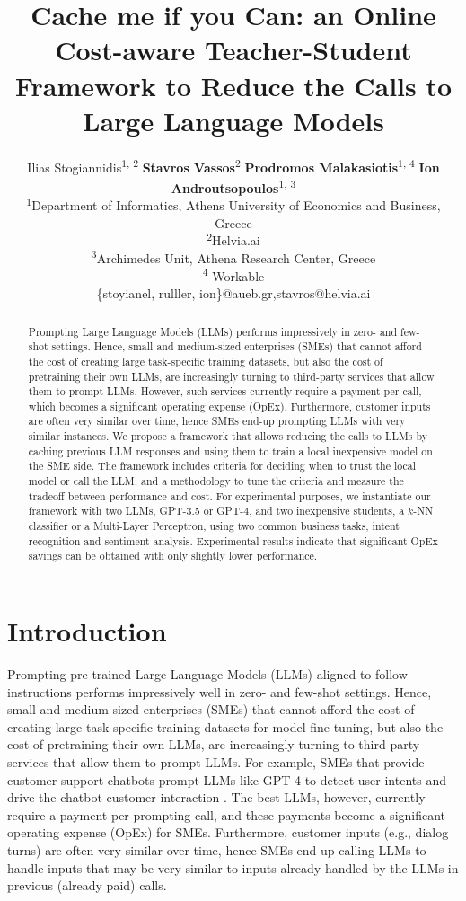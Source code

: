 \documentclass[11pt]{article}
\title{Cache me if you Can: an Online Cost-aware Teacher-Student Framework to Reduce the Calls to Large Language Models}
\author{Ilias Stogiannidis\textsuperscript{$1$, $2$} 
  {\bf Stavros Vassos}\textsuperscript{$2$}
  {\bf Prodromos Malakasiotis}\textsuperscript{$1$, $4$}
  {\bf Ion Androutsopoulos}\textsuperscript{$1$, $3$}\\
  \textsuperscript{$1$}Department of Informatics, Athens University of Economics and Business, Greece \\
  \textsuperscript{$2$}Helvia.ai \\
  \textsuperscript{$3$}Archimedes Unit, Athena Research Center, Greece \\
  \textsuperscript{$4$} Workable \\
  \{stoyianel, rulller, ion\}@aueb.gr,\space stavros@helvia.ai}
\begin{document}
\maketitle 

\begin{abstract}
Prompting Large Language Models (LLMs) performs impressively in zero- and few-shot settings. Hence, small and medium-sized enterprises (SMEs) that cannot afford the cost of creating large task-specific training datasets, but also the cost of pretraining their own LLMs, are increasingly turning to third-party services that allow them to prompt LLMs. However, such services currently require a payment per call, which becomes a significant operating expense (OpEx). Furthermore, customer inputs are often very similar over time, hence SMEs end-up prompting LLMs with very similar instances. We propose a framework that allows reducing the calls to LLMs by caching previous LLM responses and using them to train a local inexpensive model on the SME side. The framework includes criteria for deciding when to trust the local model or call the LLM, and a methodology to tune the criteria and measure the tradeoff between performance and cost. For experimental purposes, we instantiate our framework with two LLMs, GPT-3.5 or GPT-4, and two inexpensive students, a $k$-NN classifier or a Multi-Layer Perceptron, using two common business tasks, intent recognition and sentiment analysis. Experimental results indicate that significant OpEx savings can be obtained with only slightly lower performance. 
\end{abstract}


\section{Introduction}

Prompting pre-trained Large Language Models (LLMs) aligned to follow instructions \cite{InstructGPT,OpenAssistant} performs impressively well in zero- and few-shot settings. Hence, small and medium-sized enterprises (SMEs) that cannot afford the cost of creating large task-specific training datasets for model fine-tuning, but also the cost of pretraining their own LLMs, are increasingly turning to third-party services that allow them to prompt LLMs. For example, SMEs that provide customer support chatbots prompt LLMs like GPT-4 \cite{OpenAI2023GPT4TR} to detect user intents and drive the chatbot-customer interaction \cite{GPT2Dialogues}. The best LLMs, however, currently require a payment per prompting call, and these payments become a significant operating expense (OpEx) for SMEs. Furthermore, customer inputs (e.g., dialog turns) are often very similar over time, hence SMEs end up calling LLMs to handle inputs that may be very similar to inputs already handled by the LLMs in previous (already paid) calls. 
\end{document}
